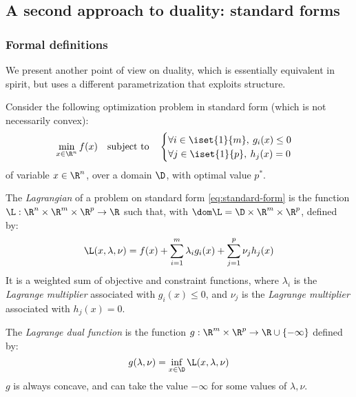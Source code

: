 \subsection{A second approach to duality: standard forms}
\subsubsection{Formal definitions}
We present another point of view on duality, which is essentially equivalent in spirit, but uses a different parametrization that exploits structure.

Consider the following optimization problem in standard form (which is not necessarily convex):
\begin{equation}
    \label{eq:standard-form}
    \min_{x\in\R^n} f(x) \quad\text{subject to}\quad \begin{cases}
        \forall i\in\iset{1}{m}, \: g_i(x)\leq0\\
        \forall j\in\iset{1}{p}, \: h_j(x)=0
    \end{cases}
\end{equation}
of variable $x\in\R^n$, over a domain $\D$, with optimal value $p^*$.

\begin{definition}[Lagrangian]
    The \emph{Lagrangian} of a problem on standard form \eqref{eq:standard-form} is the function $\L:\R^n\times\R^m\times\R^p\to\R$ such that, with $\dom\L=\D\times\R^m\times\R^p$, defined by:
    \begin{equation}
        \L(x, \lambda, \nu) = f(x) + \sum_{i=1}^m\lambda_ig_i(x) + \sum_{j=1}^p\nu_jh_j(x)
    \end{equation}
    It is a weighted sum of objective and constraint functions, where $\lambda_i$ is the \emph{Lagrange multiplier} associated with $g_i(x)\leq0$, and $\nu_j$ is the \emph{Lagrange multiplier} associated with $h_j(x)=0$.
\end{definition}

\begin{definition}
    The \emph{Lagrange dual function} is the function $g:\R^m\times\R^p\to\R\cup\{-\infty\}$ defined by:
    \begin{equation}
        g(\lambda, \nu) = \inf_{x\in\D} \L(x, \lambda, \nu)
    \end{equation}
    $g$ is always concave, and can take the value $-\infty$ for some values of $\lambda, \nu$.
\end{definition}

